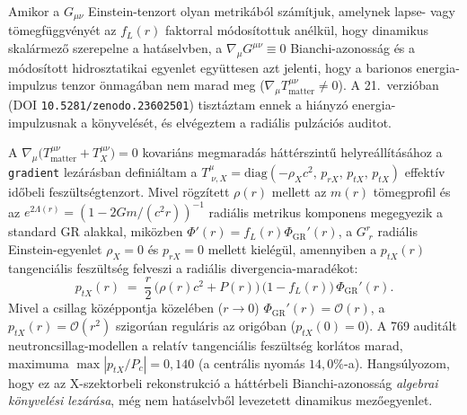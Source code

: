 
Amikor a $G_{\mu\nu}$ Einstein-tenzort olyan metrik\'ab\'ol sz\'am\'itjuk, amelynek lapse- vagy t\"omegf\"uggv\'eny\'et az $f_L(r)$ faktorral m\'odos\'itottuk an\'elk\"ul, hogy dinamikus skal\'armez\H{o} szerepelne a hat\'aselvben, a $\nabla_\mu G^{\mu\nu} \equiv 0$ Bianchi-azonoss\'ag \'es a m\'odos\'itott hidrosztatikai egyenlet egy\"uttesen azt jelenti, hogy a barionos energia-impulzus tenzor \"onmag\'aban nem marad meg ($\nabla_\mu T^{\mu\nu}_{\text{matter}} \neq 0$). A 21.\ verzi\'oban (DOI \texttt{10.5281/zenodo.23602501}) tiszt\'aztam ennek a hi\'anyz\'o energia-impulzusnak a k\"onyvel\'es\'et, \'es elv\'egeztem a radi\'alis pulz\'aci\'os auditot.

\par
A $\nabla_\mu\bigl(T^{\mu\nu}_{\text{matter}} + T^{\mu\nu}_X\bigr) = 0$ kovari\'ans megmarad\'as h\'att\'erszint\H{u} helyre\'all\'it\'as\'ahoz a \texttt{gradient} lez\'ar\'asban defini\'altam a $T^\mu_{\;\nu,X} = \text{diag}(-\rho_X c^2,\, p_{rX},\, p_{tX},\, p_{tX})$ effekt\'iv id\H{o}beli fesz\"ults\'egtenzort. Mivel r\"ogz\'itett $\rho(r)$ mellett az $m(r)$ t\"omegprofil \'es az $e^{2\Lambda(r)} = (1 - 2Gm/(c^2 r))^{-1}$ radi\'alis metrikus komponens megegyezik a standard GR alakkal, mik\"ozben $\Phi'(r) = f_L(r)\Phi_{\text{GR}}'(r)$, a $G^r_{\;r}$ radi\'alis Einstein-egyenlet $\rho_X = 0$ \'es $p_{rX} = 0$ mellett kiel\'eg\"ul, amennyiben a $p_{tX}(r)$ tangenci\'alis fesz\"ults\'eg felveszi a radi\'alis divergencia-marad\'ekot:
\begin{equation}
  p_{tX}(r) \;=\; \frac{r}{2}\,\bigl(\rho(r)c^2 + P(r)\bigr)\,\bigl(1 - f_L(r)\bigr)\,\Phi_{\text{GR}}'(r).
\end{equation}
Mivel a csillag k\"oz\'eppontja k\"ozel\'eben ($r \to 0$) $\Phi_{\text{GR}}'(r) = \mathcal{O}(r)$, a $p_{tX}(r) = \mathcal{O}(r^2)$ szigor\'uan regul\'aris az orig\'oban ($p_{tX}(0) = 0$). A 769 audit\'alt neutroncsillag-modellen a relat\'iv tangenci\'alis fesz\"ults\'eg korl\'atos marad, maximuma \textbf{$\max |p_{tX}/P_c| = 0{,}140$} (a centr\'alis nyom\'as $14{,}0\%$-a). Hangs\'ulyozom, hogy ez az X-szektorbeli rekonstrukci\'o a h\'att\'erbeli Bianchi-azonoss\'ag \emph{algebrai k\"onyvel\'esi lez\'ar\'asa}, m\'eg nem hat\'aselvb\H{o}l levezetett dinamikus mez\H{o}egyenlet.


